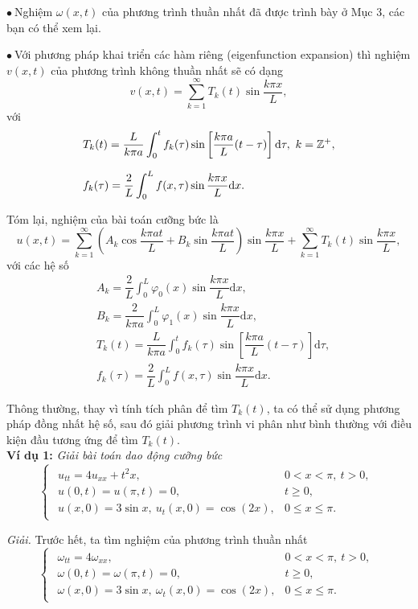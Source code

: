 \documentclass[10pt, a4paper]{article}
\begin{document}
	$\bullet~$Nghiệm $\omega(x,t)$ của phương trình thuần nhất đã được trình bày ở Mục 3, các bạn có thể xem lại.\vskip7pt
	
	$\bullet~$Với phương pháp khai triển các hàm riêng (eigenfunction expansion) thì nghiệm $v(x,t)$ của phương trình không thuần nhất sẽ có dạng 
	$$v(x,t)=\displaystyle\sum_{k=1}^\infty T_k(t)\sin\dfrac{k\pi x}{L},$$ với \begin{align*}
		&T_k(t)=\dfrac{L}{k\pi a}\displaystyle\int_0^tf_k(\tau)\sin\left[\dfrac{k\pi a}{L}(t-\tau)\right]\text{d}\tau,~k=\mathbb Z^+,\\
		\noalign{\vskip7pt}
		&f_k(\tau)=\dfrac2L\displaystyle\int_0^Lf(x,\tau)\sin\dfrac{k\pi x}{L}\text{d}x.
	\end{align*}
	
	Tóm lại, nghiệm của bài toán cưỡng bức là $$u(x,t)=\displaystyle\sum_{k=1}^\infty\left(A_k\cos\dfrac{k\pi a t}{L}+B_k\sin\dfrac{k\pi at}{L}\right)\sin\dfrac{k\pi x}{L}+\displaystyle\sum_{k=1}^\infty T_k(t)\sin\dfrac{k\pi x}{L},$$ với các hệ số \begin{align*}
		&A_k=\dfrac2L\displaystyle\int_0^L\varphi_0(x)\sin\dfrac{k\pi x}{L}\text{d}x,\\
		&B_k=\dfrac{2}{k\pi a}\displaystyle\int_0^L\varphi_1(x)\sin\dfrac{k\pi x}{L}\text{d}x,\\
		&T_k(t)=\dfrac{L}{k\pi a}\displaystyle\int_0^tf_k(\tau)\sin\left[\dfrac{k\pi a}{L}(t-\tau)\right]\text{d}\tau,\\
		&f_k(\tau)=\dfrac2L\displaystyle\int_0^Lf(x,\tau)\sin\dfrac{k\pi x}{L}\text{d}x.
	\end{align*}
	
	Thông thường, thay vì tính tích phân để tìm $T_k(t)$, ta có thể sử dụng phương pháp đồng nhất hệ số, sau đó giải phương trình vi phân như bình thường với điều kiện đầu tương ứng để tìm $T_k(t)$.\\
	
	\textbf{Ví dụ 1:} \textit{Giải bài toán dao động cưỡng bức} $$\begin{cases}
		\begin{array}{ll}
			u_{tt}=4u_{xx}+t^2x, & 0<x<\pi,~t>0, \\
			u(0,t)=u(\pi,t)=0, & t\ge0,\\
			u(x,0)=3\sin x,~u_t(x,0)=\cos(2x), & 0\le x\le\pi.
		\end{array}
	\end{cases}$$
	
	\textit{Giải.} Trước hết, ta tìm nghiệm của phương trình thuần nhất $$\begin{cases}
		\begin{array}{ll}
			\omega_{tt}=4\omega_{xx}, & 0<x<\pi,~t>0, \\
			\omega(0,t)=\omega(\pi,t)=0, & t\ge0,\\
			\omega(x,0)=3\sin x,~\omega_t(x,0)=\cos(2x), & 0\le x\le\pi.
		\end{array}
	\end{cases}$$
	
\end{document}
